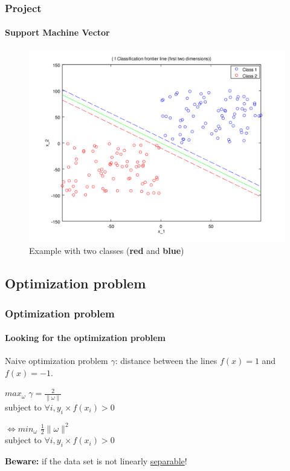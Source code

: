 \documentclass{beamer}
\begin{document}
\begin{frame}
\frametitle{Project}
\framesubtitle{\textbf{Support Machine Vector}}

         \begin{figure}
         \centering
         \caption{Example with two classes (\textbf{red} and \textbf{blue})}
         \includegraphics[scale=0.4]{images/voronoi.png}
         \end{figure}

\end{frame}

\subsection{Optimization problem}

\begin{frame}
\frametitle{Optimization problem}
\framesubtitle{Looking for the optimization problem}

\begin{block}{Naive optimization problem}
$\gamma$: distance between the lines $f(x) = 1$ and $f(x) = -1$.

\pause

      \begin{center}
        $max_{\omega}$ $\gamma = \frac{2}{\|\omega\|}$\\
        subject to $\forall i, y_i \times f(x_i) > 0$\\

\pause

       \bigskip
        $\Leftrightarrow min_{\omega}$ $\frac{1}{2} \|\omega\|^2$\\
        subject to $\forall i, y_i \times f(x_i) > 0$\\
      \end{center}

\end{block}

\textbf{Beware:} if the data set is not linearly \underline{separable}!

\end{frame}
\end{document}

